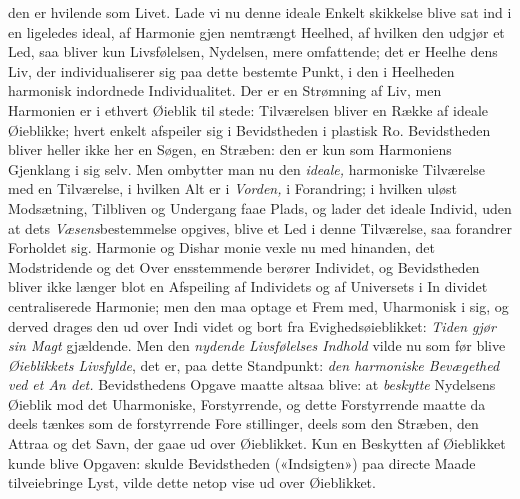 den er hvilende som Livet. Lade vi nu denne ideale Enkelt\-%
skikkelse blive sat ind i en ligeledes ideal, af Harmonie gjen\-%
nemtrængt Heelhed, af hvilken den udgjør et Led, saa bliver
kun Livsfølelsen, Nydelsen, mere omfattende; det er Heelhe\-%
dens Liv, der individualiserer sig paa dette bestemte Punkt, i
den i Heelheden harmonisk indordnede Individualitet. Der er
en Strømning af Liv, men Harmonien er i ethvert Øieblik til\-%
stede: Tilværelsen bliver en Række af ideale Øieblikke; hvert
enkelt afspeiler sig i Bevidstheden i plastisk Ro. Bevidstheden
bliver heller ikke her en Søgen, en Stræben: den er kun som
Harmoniens Gjenklang i sig selv. Men ombytter man nu den
\emph{ideale,} harmoniske Tilværelse med en Tilværelse, i hvilken
Alt er i \emph{Vorden,} i Forandring; i hvilken uløst Modsætning,
Tilbliven og Undergang faae Plads, og lader det ideale Individ,
uden at dets \emph{Væsens}bestemmelse opgives, blive et Led i denne
Tilværelse, saa forandrer Forholdet sig. Harmonie og Dishar\-%
monie vexle nu med hinanden, det Modstridende og det Over\-%
ensstemmende berører Individet, og Bevidstheden bliver ikke
længer blot en Afspeiling af Individets og af Universets i In\-%
dividet centraliserede Harmonie; men den maa optage et Frem\-%
med, Uharmonisk i sig, og derved drages den ud over Indi\-%
videt og bort fra Evighedsøieblikket: \emph{Tiden gjør sin Magt}
gjældende. Men den \emph{nydende Livsfølelses Indhold} vilde
%
%
nu som før blive \emph{Øieblikkets Livsfylde}, det er, paa dette
Standpunkt: \emph{den harmoniske Bevægethed ved et An\-%
det.} Bevidsthedens Opgave maatte altsaa blive: at \emph{beskytte}
Nydelsens Øieblik mod det Uharmoniske, Forstyrrende, og dette
Forstyrrende maatte da deels tænkes som de forstyrrende Fore\-%
stillinger, deels som den Stræben, den Attraa og det Savn,
der gaae ud over Øieblikket. Kun en Beskytten af Øieblikket
kunde blive Opgaven: skulde Bevidstheden («Indsigten») paa
directe Maade tilveiebringe Lyst, vilde dette netop vise ud over
Øieblikket.

